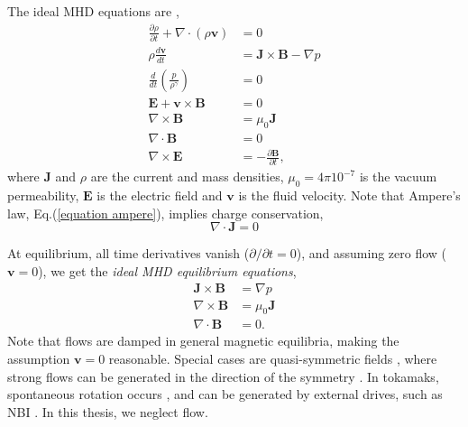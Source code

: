 \documentclass[my_thesis.tex]{subfiles}
\begin{document}
The ideal \ac{MHD} equations are \citep{Freidberg2014},
\begin{align}
	\frac{\partial \rho}{\partial t} + \nabla\cdot(\rho\mathbf{v}) &= 0 \label{mass equation}\\
	\rho\frac{d\mathbf{v}}{dt} &= \mathbf{J}\times\mathbf{B} - \nabla p \label{momentum equation}\\
	\frac{d}{dt}\left(\frac{p}{\rho^\gamma}\right) &= 0 \label{energy equation}\\
	\mathbf{E} + \mathbf{v}\times\mathbf{B} &= 0 \label{ideal Ohms law}\\
	\nabla\times\mathbf{B} &=\mu_0\mathbf{J} \label{equation ampere}\\
	\nabla\cdot\mathbf{B}&=0 \label{equation div B}\\
	\nabla\times\mathbf{E}&=-\frac{\partial \mathbf{B}}{\partial t}, \label{equation rot E}
\end{align}
where $\mathbf{J}$ and $\rho$ are the current and mass densities, $\mu_0=4\pi 10^{-7}$ is the vacuum permeability, $\mathbf{E}$ is the electric field and $\mathbf{v}$ is the fluid velocity. Note that Ampere's law, Eq.(\ref{equation ampere}), implies charge conservation,
\begin{equation}
	\nabla\cdot\mathbf{J} = 0\label{equation charge conservation}
\end{equation}

At equilibrium, all time derivatives vanish ($\partial/\partial t = 0$), and assuming zero flow ($\mathbf{v}=0$), we get the \emph{ideal MHD equilibrium equations},
\begin{align}
	\mathbf{J}\times\mathbf{B} &= \nabla p \label{equation perp force balance}\\
	\nabla\times\mathbf{B} &=\mu_0\mathbf{J}\\
	\nabla\cdot\mathbf{B}&=0.\label{equation div B ideal mhd}
\end{align}
Note that flows are damped in general magnetic equilibria, making the assumption $\mathbf{v}=0$ reasonable. Special cases are quasi-symmetric fields \citep{boozerTransportIsomorphicEquilibria1983,nuhrenbergQuasihelicallySymmetricToroidal1988,helanderTheoryPlasmaConfinement2014,rodriguezNecessarySufficientConditions2020}, where strong flows can be generated in the direction of the symmetry \citep{spongGenerationDampingNeoclassical2005,helanderIntrinsicAmbipolarityRotation2008,simakovPlasmaRotationQuasisymmetric2011}. In tokamaks, spontaneous rotation occurs \citep{diamondPhysicsNondiffusiveTurbulent2009}, and can be generated by external drives, such as \ac{NBI} \citep{suckewerToroidalPlasmaRotation1979}. In this thesis, we neglect flow. 
\end{document}
